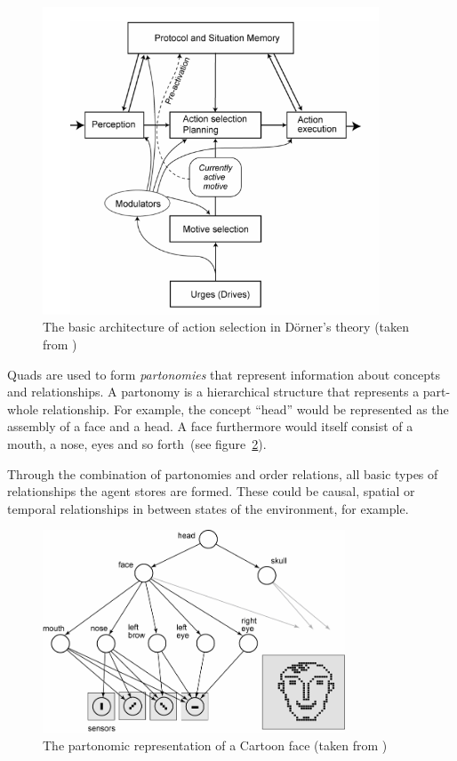 \begin{figure}[h]
  \centering
    \includegraphics[width=10cm]{graphics/motive_architecture}
  \caption{The basic architecture of action selection in Dörner's theory (taken from \cite{Bach:2009:PSI:1611304})}
  \label{motive_architecture}
\end{figure}

Quads are used to form \emph{partonomies} that represent information about concepts and relationships. A partonomy is a hierarchical structure that represents a part-whole relationship. For example, the concept ``head'' would be represented as the assembly of a face and a head. A face furthermore would itself consist of a mouth, a nose, eyes and so forth~(see figure~\ref{partonomy}). 

Through the combination of partonomies and order relations, all basic types of relationships the agent stores are formed. These could be causal, spatial or temporal relationships in between states of the environment, for example.

\begin{figure}[h]
  \centering
    \includegraphics[width=9cm]{graphics/partonomy}
  \caption{The partonomic representation of a Cartoon face (taken from \cite{Bach:2009:PSI:1611304})}
  \label{partonomy}
\end{figure}


